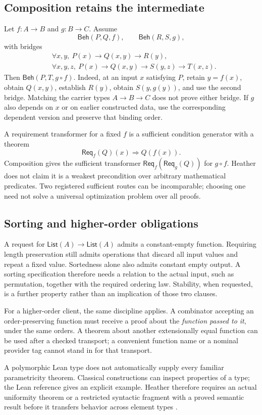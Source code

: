 \documentclass[11pt,letterpaper]{article}
\newcommand{\Beh}{\mathsf{Beh}}\newcommand{\Req}{\mathsf{Req}}
\theoremstyle{definition}\newtheorem{definition}[theorem]{Definition}
\theoremstyle{remark}\newtheorem{remark}[theorem]{Remark}
\begin{document}
\subsection{Composition retains the intermediate}
Let $f:A\to B$ and $g:B\to C$. Assume
\[
 \Beh(P,Q,f),\qquad \Beh(R,S,g),
\]
with bridges
\begin{align*}
 &\forall x,y,\ P(x)\to Q(x,y)\to R(y),\\
 &\forall x,y,z,\ P(x)\to Q(x,y)\to S(y,z)\to T(x,z).
\end{align*}
Then $\Beh(P,T,g\circ f)$. Indeed, at an input $x$ satisfying $P$, retain
$y=f(x)$, obtain $Q(x,y)$, establish $R(y)$, obtain $S(y,g(y))$, and use the
second bridge. Matching the carrier types $A\to B\to C$ does not prove either
bridge. If $g$ also depends on $x$ or on earlier constructed data, use the
corresponding dependent version and preserve that binding order.

A requirement transformer for a fixed $f$ is a sufficient condition generator
with a theorem
\[
 \Req_f(Q)(x)\Longrightarrow Q(f(x)).
\]
Composition gives the sufficient transformer
$\Req_f(\Req_g(Q))$ for $g\circ f$. Heather does not claim it is a weakest
precondition over arbitrary mathematical predicates. Two registered sufficient
routes can be incomparable; choosing one need not solve a universal optimization
problem over all proofs.

\subsection{Sorting and higher-order obligations}
A request for $\mathsf{List}(A)\to\mathsf{List}(A)$ admits a constant-empty
function. Requiring length preservation still admits operations that discard
all input values and repeat a fixed value. Sortedness alone also admits
constant empty output. A sorting specification therefore needs a relation to
the actual input, such as permutation, together with the required ordering law.
Stability, when requested, is a further property rather than an implication of
those two clauses.

For a higher-order client, the same discipline applies. A combinator accepting
an order-preserving function must receive a proof about the \emph{function
passed to it}, under the same orders. A theorem about another extensionally
equal function can be used after a checked transport; a convenient function
name or a nominal provider tag cannot stand in for that transport.

A polymorphic Lean type does not automatically supply every familiar
parametricity theorem. Classical constructions can inspect properties of a
type; the Lean reference gives an explicit example. Heather therefore requires
an actual uniformity theorem or a restricted syntactic fragment with a proved
semantic result before it transfers behavior across element types
\cite{lean-axioms}.
\end{document}
